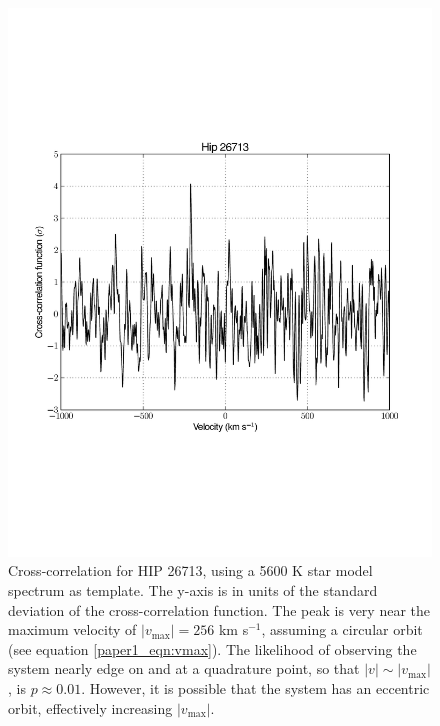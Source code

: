 \begin{figure}[ht]
  \centering
  \includegraphics[width=\columnwidth]{Figures/paper1_fig4.pdf}
  \caption{Cross-correlation for HIP 26713, using a 5600 K star model spectrum as template. The y-axis is in units of
    the standard deviation of the cross-correlation function. The peak is very near the maximum velocity of $|v_\mathrm{max}| = 256$ km s$^{-1}$, assuming a circular orbit (see equation \ref{paper1_eqn:vmax}). The likelihood of observing the system nearly edge on and at a quadrature point, so that $|v| \sim |v_\mathrm{max}|$, is $p \approx 0.01$. However, it is possible that the system has an eccentric orbit, effectively increasing $|v_\mathrm{max}|$.}
  \label{paper1_fig:hip26713}
\end{figure}

